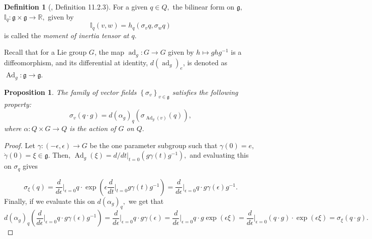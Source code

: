 \documentclass[12pt, letterpaper, reqno]{amsart}
\theoremstyle{definition}
\newtheorem{df}{Definition}
\theoremstyle{plain}
\newtheorem{prop}{Proposition}
\theoremstyle{remark}
\providecommand{\DIFaddbegin}{} %
\providecommand{\DIFaddend}{} %
\providecommand{\DIFdelbegin}{} %
\providecommand{\DIFdelend}{} %
\newcommand{\DIFscaledelfig}{0.5}
\newlength{\DIFdelgraphicswidth} %
\newlength{\DIFdelgraphicsheight} %
\newcommand{\DIFaddincludegraphics}[2][]{{\color{blue}\fbox{\DIFOincludegraphics[#1]{#2}}}} %
\newcommand{\DIFdelincludegraphics}[2][]{%
\sbox{\DIFdelgraphicsbox}{\DIFOincludegraphics[#1]{#2}}%
\settoboxwidth{\DIFdelgraphicswidth}{\DIFdelgraphicsbox} %
\settoboxtotalheight{\DIFdelgraphicsheight}{\DIFdelgraphicsbox} %
\scalebox{\DIFscaledelfig}{%
\parbox[b]{\DIFdelgraphicswidth}{\usebox{\DIFdelgraphicsbox}\\[-\baselineskip] \rule{\DIFdelgraphicswidth}{0em}}\llap{\resizebox{\DIFdelgraphicswidth}{\DIFdelgraphicsheight}{%
\setlength{\unitlength}{\DIFdelgraphicswidth}%
\begin{picture}(1,1)%
\thicklines\linethickness{2pt} %
{\color[rgb]{1,0,0}\put(0,0){\framebox(1,1){}}}%
{\color[rgb]{1,0,0}\put(0,0){\line( 1,1){1}}}%
{\color[rgb]{1,0,0}\put(0,1){\line(1,-1){1}}}%
\end{picture}%
}\hspace*{3pt}}} %
} %
\DeclareRobustCommand{\DIFaddbegin}{\DIFOaddbegin \let\includegraphics\DIFaddincludegraphics} %
\DeclareRobustCommand{\DIFaddend}{\DIFOaddend \let\includegraphics\DIFOincludegraphics} %
\DeclareRobustCommand{\DIFdelbegin}{\DIFOdelbegin \let\includegraphics\DIFdelincludegraphics} %
\DeclareRobustCommand{\DIFdelend}{\DIFOaddend \let\includegraphics\DIFOincludegraphics} %
\begin{document}
\DIFdelbegin %
\DIFdelend \DIFaddbegin \begin{df}[\cite{montgomery2002tour}, Definition 11.2.3]
	\DIFaddend For a given $ q\in Q, $ the bilinear form on $ \mathfrak{g}, $ $ \mathbb{I}_q: \mathfrak{g}\times \mathfrak{g}\rightarrow \mathbb{R}, $ given by
	$$ \mathbb{I}_q(v,w) = h_q(\sigma_v q, \sigma_w q) $$ 
	is called the \textit{moment of inertia tensor at $ q. $ } 
\end{df}

Recall that for a Lie group $ G $, the map $ \operatorname{ad}_g: G \rightarrow G  $ given by $ h\mapsto ghg^{-1} $ is a diffeomorphism, and its differential at identity, $ d( \operatorname{ad}_g )_e $,  is denoted as $ \operatorname{Ad}_g: \mathfrak{g}\rightarrow \mathfrak{g} $. 

\begin{prop}\label{prop:equiv_infinitesimal}
	The family of vector fields $ \left\{ \sigma_v \right\}_{v\in \mathfrak{g}} $ satisfies the following property:
	$$ \sigma_v(q\cdot g) = d(\alpha_g)_q\left(\sigma_{\operatorname{Ad}_g(v)}(q)\right) ,$$ 
	where $ \alpha: Q\times G \rightarrow Q $ is the action of $ G $ on $ Q. $ 
\end{prop}
\begin{proof}
	Let $ \gamma:(-\epsilon,\epsilon) \rightarrow G $ be the one parameter subgroup such that $ \gamma(0)=e, $ $ \dot{\gamma}(0)=\xi\in \mathfrak{g}. $ Then, $ \operatorname{Ad}_g \left( \xi \right) = d/dt|_{t=0}(g\gamma(t)g^{-1}), $ and evaluating this on $ \sigma_q $ gives

	$$ \sigma_{\xi}(q) = \frac{d}{d\epsilon} \Big|_{\epsilon=0} q\cdot \operatorname{exp} \left( \epsilon \frac{d}{dt} \Big|_{t=0} g\gamma(t)g^{-1} \right) = \frac{d}{d\epsilon} \Big|_{\epsilon=0} q\cdot g\gamma(\epsilon)g^{-1}. $$ 
	Finally, if we evaluate this on $ d(\alpha_g)_q, $ we get that
	\begin{dmath*}
		d(\alpha_g)_q \left( \frac{d}{d\epsilon} \Big|_{\epsilon=0} q\cdot g\gamma(\epsilon)g^{-1} \right) = \frac{d}{d\epsilon} \Big|_{\epsilon=0}  q \cdot g\gamma(\epsilon)= \frac{d}{d\epsilon} \Big|_{\epsilon=0} q\cdot g \operatorname{exp} \left( \epsilon\xi \right) = \frac{d}{d\epsilon} \Big|_{\epsilon=0} (q\cdot g) \cdot \operatorname{exp} (\epsilon\xi)= \sigma_\xi(q\cdot g). 
	\end{dmath*}
\end{proof}
\end{document}
